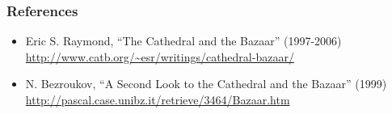 \documentclass{beamer}
\begin{document}
\begin{frame}
\frametitle{References}

{\small
\begin{itemize}
\item Eric S. Raymond, ``The Cathedral and the Bazaar'' (1997-2006)
  \url{http://www.catb.org/~esr/writings/cathedral-bazaar/}
\item N. Bezroukov, ``A Second Look to the Cathedral and the Bazaar''
  (1999) \url{http://pascal.case.unibz.it/retrieve/3464/Bazaar.htm}
\end{itemize}
}

\end{frame}
\end{document}

